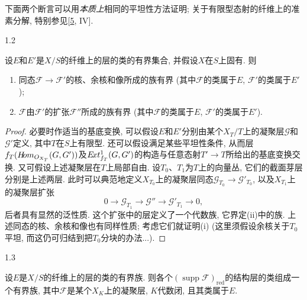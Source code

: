 \par{}下面两个断言可以用\emph{本质上}相同的平坦性方法证明; 关于有限型态射的纤维上的准素分解, 特别参见[\hyperref[GD1960]{5}, IV].
\begin{proposition}{1.2}\label{fga3.iv-1-proposition-1.2}\skipsinglepar
\par{}设\(E\)和\(E'\)是\(X/S\)的纤维上的层的类的有界集合, 并假设\(X\)在\(S\)上固有. 则
\begin{enumerate}
      
 \item[i.]同态\(\mathscr {F}\to \mathscr {F}'\)的核、余核和像所成的族有界 (其中\(\mathscr {F}\)的类属于\(E\), \(\mathscr {F}'\)的类属于\(E'\));

      
 \item[ii.]\(\mathscr {F}\)由\(\mathscr {F}'\)的扩张\(\mathscr {F}''\)所成的族有界 (其中\(\mathscr {F}\)的类属于\(E\), \(\mathscr {F}'\)的类属于\(E'\)).

    
\end{enumerate}
\begin{proof}
\par{}必要时作适当的基底变换, 可以假设\(E\)和\(E'\)分别由某个\(X_T/T\)上的凝聚层\(\mathscr {G}\)和\(\mathscr {G}'\)定义, 其中\(T\)在\(S\)上有限型. 还可以假设满足某些平坦性条件, 从而层\(f_T(\mathscr {H}\kern  -2.5pt\mathit {om}_{\mathcal {O}_{X_T}}(\mathscr {G},\mathscr {G}'))\)及\(\mathscr {E}\kern  -1.5pt\mathit {xt}_{f_T}^1(\mathscr {G},\mathscr {G}')\)的构造与任意态射\(T'\to  T\)所给出的基底变换交换. 又可假设上述凝聚层在\(T\)上局部自由. 设\(T_0\)、\(T_1\)为\(T\)上的向量丛, 它们的截面芽层分别是上述两层. 此时可以典范地定义\(X_{T_0}\)上的凝聚层同态\(\mathscr {G}_{T_0}\to \mathscr {G}'_{T_0}\), 以及\(X_{T_1}\)上的凝聚层扩张\[         0 \to  \mathscr {G}_{T_1} \to  \mathscr {G}'' \to  \mathscr {G}'_{T_1} \to  0,\] 后者具有显然的泛性质. 这个扩张中的层定义了一个代数族, 它界定(ii)中的族. 上述同态的核、余核和像也有同样性质; 考虑它们就证明(i) (这里须假设余核关于\(T_0\)平坦, 而这仍可归结到把\(T_0\)分块的办法...).
\end{proof}
\end{proposition}
\begin{proposition}{1.3}\label{fga3.iv-1-proposition-1.3}\skipsinglepar
\par{}设\(E\)是\(X/S\)的纤维上的层的类的有界族. 则各个\((\operatorname {supp}\mathscr {F})_\mathrm {red}\)的结构层的类组成一个有界族, 其中\(\mathscr {F}\)是某个\(X_K\)上的凝聚层, \(K\)代数闭, 且其类属于\(E\).
\end{proposition}
